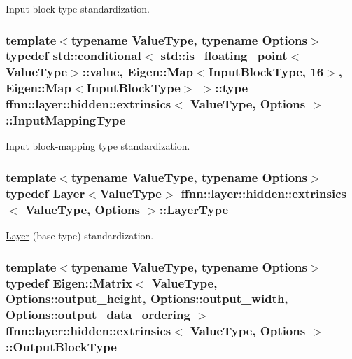 Input block type standardization. 

\hypertarget{structffnn_1_1layer_1_1hidden_1_1extrinsics_a62256f740b1aaf253c9992d15cda7eab}{
\subsubsection[{Input\-Mapping\-Type}]{\setlength{\rightskip}{0pt plus 5cm}template$<$typename Value\-Type, typename Options$>$ typedef std\-::conditional$<$ std\-::is\-\_\-floating\-\_\-point$<$Value\-Type$>$\-::value, Eigen\-::\-Map$<${\bf Input\-Block\-Type}, 16$>$, Eigen\-::\-Map$<${\bf Input\-Block\-Type}$>$ $>$\-::type {\bf ffnn\-::layer\-::hidden\-::extrinsics}$<$ Value\-Type, Options $>$\-::{\bf Input\-Mapping\-Type}}}\label{structffnn_1_1layer_1_1hidden_1_1extrinsics_a62256f740b1aaf253c9992d15cda7eab}


Input block-\/mapping type standardization. 

\hypertarget{structffnn_1_1layer_1_1hidden_1_1extrinsics_a06f383c22ed682751b9a4cb8855da9eb}{
\subsubsection[{Layer\-Type}]{\setlength{\rightskip}{0pt plus 5cm}template$<$typename Value\-Type, typename Options$>$ typedef {\bf Layer}$<$Value\-Type$>$ {\bf ffnn\-::layer\-::hidden\-::extrinsics}$<$ Value\-Type, Options $>$\-::{\bf Layer\-Type}}}\label{structffnn_1_1layer_1_1hidden_1_1extrinsics_a06f383c22ed682751b9a4cb8855da9eb}


\hyperlink{classffnn_1_1layer_1_1_layer}{Layer} (base type) standardization. 

\hypertarget{structffnn_1_1layer_1_1hidden_1_1extrinsics_ac5ca721e2e5843ddcf90351b59c4e56e}{
\subsubsection[{Output\-Block\-Type}]{\setlength{\rightskip}{0pt plus 5cm}template$<$typename Value\-Type, typename Options$>$ typedef Eigen\-::\-Matrix$<$ Value\-Type, Options\-::output\-\_\-height, Options\-::output\-\_\-width, Options\-::output\-\_\-data\-\_\-ordering $>$ {\bf ffnn\-::layer\-::hidden\-::extrinsics}$<$ Value\-Type, Options $>$\-::{\bf Output\-Block\-Type}}}\label{structffnn_1_1layer_1_1hidden_1_1extrinsics_ac5ca721e2e5843ddcf90351b59c4e56e}


